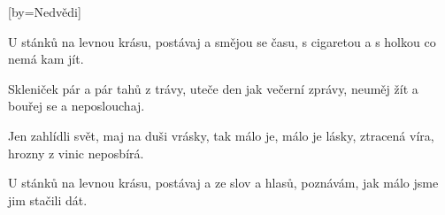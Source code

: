 [by={Nedvědi}]

\beginverse{}
U stánků na levnou krásu,
postávaj a smějou se času,
s cigaretou a s holkou co nemá kam jít.
\endverse{}

\beginverse{}
Skleniček pár a pár tahů z trávy,
uteče den jak večerní zprávy,
neuměj žít a bouřej se a neposlouchaj. 
\endverse{}

\beginchorus{}
Jen zahlídli svět, maj na duši vrásky,
tak málo je, málo je lásky,
ztracená víra, hrozny z vinic neposbírá.
\endchorus{}

\beginverse{}
U stánků na levnou krásu,
postávaj a ze slov a hlasů,
poznávám, jak málo jsme jim stačili dát. 
\endverse{}

\beginchorus{}
\phantom{}
\endchorus{}

\endsong{}
